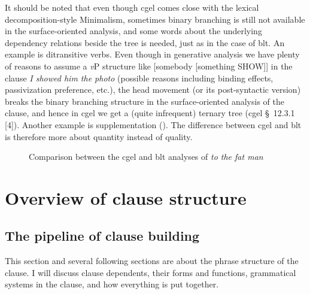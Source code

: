 \documentclass{article}
\newcommand*{\citesec}[1]{\S~{#1}}
\newcommand*{\corpus}[1]{\emph{#1}}
\newcommand*{\vP}{\textit{v}P}
\begin{document}
It should be noted that even though \ac{cgel} comes close with the lexical decomposition-style Minimalism,
sometimes binary branching is still not available in the surface-oriented analysis,
and some words about the underlying dependency relations beside the tree is needed,
just as in the case of \ac{blt}.
An example is ditransitive verbs. 
Even though in generative analysis we have plenty of reasons to assume a \vP{} structure like 
[somebody [something SHOW]] in the clause \corpus{I showed him the photo}
(possible reasons including binding effects, passivization preference, etc.),
the head movement (or its post-syntactic version) breaks the binary branching structure 
in the surface-oriented analysis of the clause,
and hence in \ac{cgel} we get a (quite infrequent) ternary tree (\ac{cgel} \citesec{12.3.1} [4]). 
Another example is supplementation ().
The difference between \ac{cgel} and \ac{blt} is therefore more about quantity instead of quality.

\begin{figure}
    \centering
    
    \caption{Comparison between the \ac{cgel} and \ac{blt} analyses of \corpus{to the fat man}}
    \label{fig:to-the-fat-man-blt}
\end{figure}

\section{Overview of clause structure}

\subsection{The pipeline of clause building}\label{sec:pipeline}

This section and several following sections are about the phrase structure of the clause.
I will discuss clause dependents, 
their forms and functions,
grammatical systems in the clause,
and how everything is put together.
\end{document}
